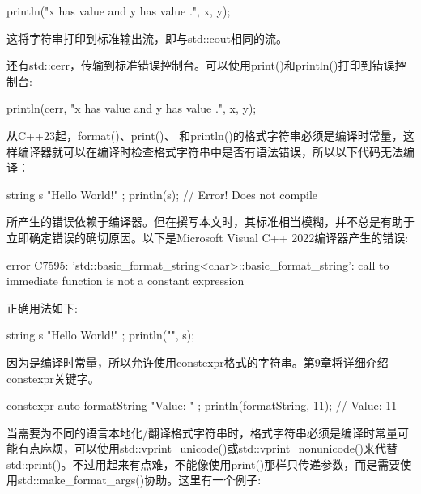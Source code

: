 \begin{cpp}
println("x has value {} and y has value {}.", x, y);
\end{cpp}

这将字符串打印到标准输出流，即与std::cout相同的流。

还有std::cerr，传输到标准错误控制台。可以使用print()和println()打印到错误控制台:

\begin{cpp}
println(cerr, "x has value {} and y has value {}.", x, y);
\end{cpp}



从C++23起，format()、print()、 和println()的格式字符串必须是编译时常量，这样编译器就可以在编译时检查格式字符串中是否有语法错误，所以以下代码无法编译：

\begin{cpp}
string s { "Hello World!" };
println(s); // Error! Does not compile
\end{cpp}

所产生的错误依赖于编译器。但在撰写本文时，其标准相当模糊，并不总是有助于立即确定错误的确切原因。以下是Microsoft Visual C++ 2022编译器产生的错误:

\begin{shell}
error C7595: 'std::basic_format_string<char>::basic_format_string': call to immediate function is not a constant expression
\end{shell}

正确用法如下:

\begin{cpp}
string s { "Hello World!" };
println("{}", s);
\end{cpp}

因为是编译时常量，所以允许使用constexpr格式的字符串。第9章将详细介绍constexpr关键字。

\begin{cpp}
constexpr auto formatString { "Value: {}" };
println(formatString, 11); // Value: 11
\end{cpp}


当需要为不同的语言本地化/翻译格式字符串时，格式字符串必须是编译时常量可能有点麻烦，可以使用std::vprint\_unicode()或std::vprint\_nonunicode()来代替std::print()。不过用起来有点难，不能像使用print()那样只传递参数，而是需要使用std::make\_format\_args()协助。这里有一个例子:

